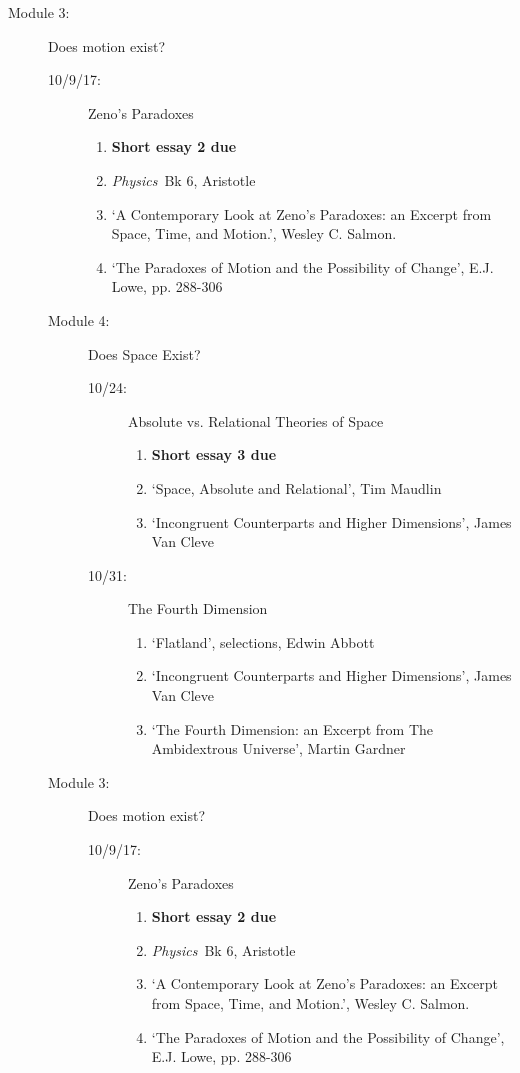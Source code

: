 \documentclass[article,oneside]{memoir}
\begin{document}
\begin{description}
\begin{description}
\end{description}

\item[Module 3:] Does motion exist? 
\begin{description}
\item [10/9/17:] Zeno's Paradoxes
\begin{enumerate}
\item \textbf{Short essay 2 due}
\item \emph{Physics}\ Bk 6, Aristotle
\item `A Contemporary Look at Zeno’s Paradoxes: an Excerpt from Space, Time, and Motion.', Wesley C. Salmon. 
\item `The Paradoxes of Motion and the Possibility of Change', E.J. Lowe, pp. 288-306
\end{enumerate}


\item[Module 4:] Does Space Exist? 
\begin{description}
\item[10/24:] Absolute vs. Relational Theories of Space
\begin{enumerate}
\item \textbf{Short essay 3 due}
\item `Space, Absolute and Relational', Tim Maudlin
\item `Incongruent Counterparts and Higher Dimensions', James Van Cleve
\end{enumerate}

\item[10/31:] The Fourth Dimension
\begin{enumerate} 
\item `Flatland', selections, Edwin Abbott 
\item `Incongruent Counterparts and Higher Dimensions', James Van Cleve
\item `The Fourth Dimension: an Excerpt from The Ambidextrous Universe', Martin Gardner
\end{enumerate}
\end{description}


\item[Module 3:] Does motion exist? 
\begin{description}
\item [10/9/17:] Zeno's Paradoxes
\begin{enumerate}
\item \textbf{Short essay 2 due}
\item \emph{Physics}\ Bk 6, Aristotle
\item `A Contemporary Look at Zeno’s Paradoxes: an Excerpt from Space, Time, and Motion.', Wesley C. Salmon. 
\item `The Paradoxes of Motion and the Possibility of Change', E.J. Lowe, pp. 288-306
\end{enumerate}


\end{description}
\end{description}
\end{description}
\end{document}
